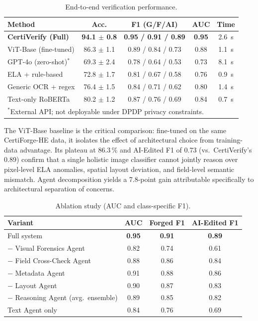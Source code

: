 \documentclass[runningheads]{llncs}
\begin{document}
\begin{table}[t]
\caption{End-to-end verification performance.}
\label{tab:main}
\centering
\begin{tabular}{lcccc}
\toprule
\textbf{Method} & \textbf{Acc.} & \textbf{F1 (G/F/AI)} & \textbf{AUC} & \textbf{Time} \\
\midrule
\textbf{CertiVerify (Full)}      & \textbf{94.1 $\pm$ 0.8} & \textbf{0.95 / 0.91 / 0.89} & \textbf{0.95} & 2.6~s \\
ViT-Base (fine-tuned)            & 86.3 $\pm$ 1.1          & 0.89 / 0.84 / 0.73          & 0.88          & 1.1~s \\
GPT-4o (zero-shot)$^{*}$         & 69.3 $\pm$ 2.4          & 0.78 / 0.64 / 0.53          & 0.73          & 8.1~s \\
ELA + rule-based                 & 72.8 $\pm$ 1.7          & 0.81 / 0.67 / 0.58          & 0.76          & 0.9~s \\
Generic OCR + regex              & 76.4 $\pm$ 1.5          & 0.84 / 0.71 / 0.62          & 0.80          & 1.4~s \\
Text-only RoBERTa                & 80.2 $\pm$ 1.2          & 0.87 / 0.76 / 0.69          & 0.84          & 0.7~s \\
\bottomrule
\multicolumn{5}{l}{\footnotesize $^{*}$External API; not deployable under DPDP privacy constraints.}
\end{tabular}
\end{table}

The ViT-Base baseline is the critical comparison: fine-tuned on the same CertiForge-HE data, it isolates the effect of architectural choice from training-data advantage. Its plateau at 86.3\,\% and AI-Edited F1 of 0.73 (vs.\ CertiVerify's 0.89) confirm that a single holistic image classifier cannot jointly reason over pixel-level ELA anomalies, spatial layout deviation, and field-level semantic mismatch. Agent decomposition yields a 7.8-point gain attributable specifically to architectural separation of concerns.

\begin{table}[t]
\caption{Ablation study (AUC and class-specific F1).}
\label{tab:ablation}
\centering
\begin{tabular}{lccc}
\toprule
\textbf{Variant} & \textbf{AUC} & \textbf{Forged F1} & \textbf{AI-Edited F1} \\
\midrule
Full system                              & \textbf{0.95} & \textbf{0.91} & \textbf{0.89} \\
$-$ Visual Forensics Agent               & 0.82 & 0.74 & 0.61 \\
$-$ Field Cross-Check Agent              & 0.88 & 0.86 & 0.84 \\
$-$ Metadata Agent                       & 0.91 & 0.88 & 0.86 \\
$-$ Layout Agent                         & 0.90 & 0.87 & 0.83 \\
$-$ Reasoning Agent (avg.\ ensemble)     & 0.89 & 0.85 & 0.82 \\
Text Agent only                          & 0.84 & 0.76 & 0.69 \\
\bottomrule
\end{tabular}
\end{table}
\end{document}
